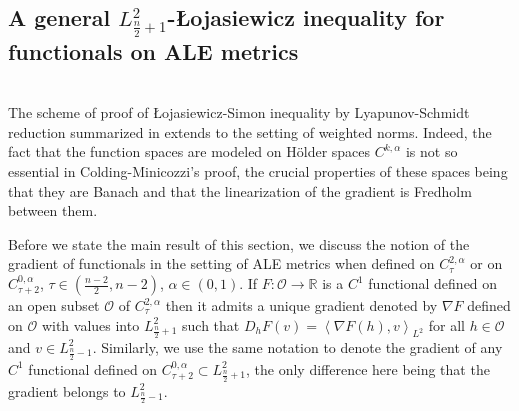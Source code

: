 \documentclass[a4paper,11pt,reqno]{amsart}
\def\RR{\mathbb{R}}
\numberwithin{equation}{section}
\begin{document}
	\subsection{A general $L^2_{\frac{n}{2}+1}$-\L{}ojasiewicz inequality for functionals on ALE metrics}\label{sec-gal-loja}~~\\
	
	The scheme of proof of \L{}ojasiewicz-Simon inequality by Lyapunov-Schmidt reduction summarized in \cite{Col-Min-Ein-Tan-Con} extends to the setting of weighted norms. Indeed, the fact that the function spaces are modeled on H\"older spaces $C^{k,\alpha}$ is not so essential in Colding-Minicozzi's proof, the crucial properties of these spaces being that they are Banach and that the linearization of the gradient is Fredholm between them.
	
Before we state the main result of this section, we discuss the notion of the gradient of  functionals in the setting of ALE metrics when defined on $C^{2,\alpha}_{\tau}$ or on $C^{0,\alpha}_{\tau+2}$, $\tau\in \left(\frac{n-2}{2},n-2\right)$, $\alpha\in(0,1)$. If $F:\mathcal{O}\rightarrow \RR$ is a $C^1$ functional defined on an open subset $\mathcal{O}$ of $C^{2,\alpha}_{\tau}$ then it admits a unique gradient denoted by $\nabla F$ defined on $\mathcal{O}$ with values into $L^{2}_{\frac{n}{2}+1}$ such that $D_{h}F(v)=\left<\nabla F(h),v\right>_{L^2}$ for all $h\in\mathcal{O}$ and $v\in L^2_{\frac{n}{2}-1}$. Similarly, we use the same notation to denote the gradient of any $C^1$ functional defined on $C^{0,\alpha}_{\tau+2}\subset L^2_{\frac{n}{2}+1}$, the only difference here being that the gradient belongs to $L^2_{\frac{n}{2}-1}$. 
\end{document}
